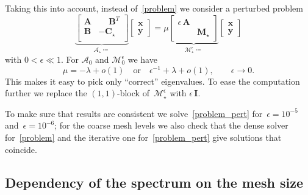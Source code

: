 \documentclass[12pt]{article}
\newcommand{\vect}[1]{\boldsymbol{\mathbf{#1}}}
\begin{document}
Taking this into account, instead of~\eqref{problem} we consider a perturbed\footnotemark{} problem
\begin{equation}\label{problem_pert}
	\underbrace{\begin{bmatrix}
		\vect A & \phantom{-}\vect B^T \\
		\vect B & -\vect C_\star \\
		\end{bmatrix}}_{\mathcal A_\star \coloneqq}
	\begin{bmatrix}
	\vect x \\
	\vect y
	\end{bmatrix}
	=
	\mu
	\underbrace{\begin{bmatrix}
		\epsilon\,\vect A & \\
		& \vect M_\star
		\end{bmatrix}}_{\mathcal M^\epsilon_\star \coloneqq}
	\begin{bmatrix}
	\vect x \\
	\vect y
	\end{bmatrix}
\end{equation}
with $0 < \epsilon \ll 1$. For $\mathcal A_0$ and $\mathcal M^\epsilon_0$ we have
\begin{equation}
	\mu = -\lambda + o(1)\quad\text{or}\quad\epsilon^{-1} + \lambda + o(1),\qquad\epsilon \rightarrow 0.
\end{equation}
This makes it easy to pick only ``correct'' eigenvalues. To ease the computation further we replace the $(1, 1)$-block of~$\mathcal M^\epsilon_\star$ with $\epsilon\,\vect I$. 

To make sure that results are consistent we solve~\eqref{problem_pert} for~$\epsilon = 10^{-5}$ and~$\epsilon = 10^{-6}$; for the coarse mesh levels we also check that the dense solver for~\eqref{problem} and the iterative one for~\eqref{problem_pert} give solutions that coincide.  


\clearpage

\subsection{Dependency of the spectrum on the mesh size}
\end{document}
